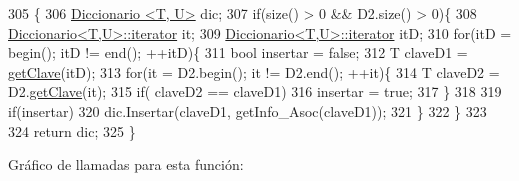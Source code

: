 \begin{DoxyCode}
305                                                                \{
306   \hyperlink{classDiccionario}{Diccionario <T, U>} dic;
307   \textcolor{keywordflow}{if}(size() > 0 && D2.size() > 0)\{
308     \hyperlink{classDiccionario_1_1iterator}{Diccionario<T,U>::iterator} it;
309     \hyperlink{classDiccionario_1_1iterator}{Diccionario<T,U>::iterator} itD;
310     \textcolor{keywordflow}{for}(itD = begin(); itD != end(); ++itD)\{
311       \textcolor{keywordtype}{bool} insertar = \textcolor{keyword}{false};
312       T claveD1 = \hyperlink{classDiccionario_a1e70807b9a2730e0d23cb7511da4536a}{getClave}(itD);
313       \textcolor{keywordflow}{for}(it = D2.begin(); it != D2.end(); ++it)\{
314         T claveD2 = D2.\hyperlink{classDiccionario_a1e70807b9a2730e0d23cb7511da4536a}{getClave}(it);
315         \textcolor{keywordflow}{if}( claveD2 == claveD1)
316             insertar = \textcolor{keyword}{true};
317       \}
318           
319       \textcolor{keywordflow}{if}(insertar)
320         dic.Insertar(claveD1, getInfo\_Asoc(claveD1));
321     \}
322   \}  
323 
324   \textcolor{keywordflow}{return} dic;
325 \}
\end{DoxyCode}
Gráfico de llamadas para esta función\+:
